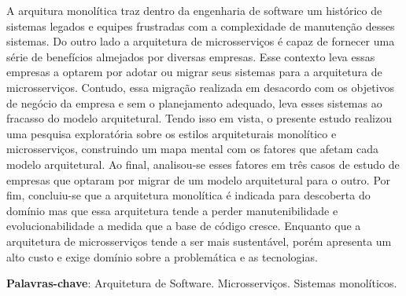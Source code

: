 \begin{resumo}
    A arquitura monolítica traz dentro da engenharia de software um histórico de sistemas legados e
    equipes frustradas com a complexidade de manutenção desses sistemas. Do outro lado a arquitetura
    de microsserviços é capaz de fornecer uma série de benefícios almejados por diversas empresas.
    Esse contexto leva essas empresas a optarem por adotar ou migrar seus sistemas para a
    arquitetura de microsserviços. Contudo, essa migração realizada em desacordo com os objetivos de
    negócio da empresa e sem o planejamento adequado, leva esses sistemas ao fracasso do modelo
    arquitetural. Tendo isso em vista, o presente estudo realizou uma pesquisa exploratória sobre os
    estilos arquiteturais monolítico e microsserviços, construindo um mapa mental com os fatores que
    afetam cada modelo arquitetural. Ao final, analisou-se esses fatores em três casos de estudo de
    empresas que optaram por migrar de um modelo arquitetural para o outro. Por fim, concluiu-se que
    a arquitetura monolítica é indicada para descoberta do domínio mas que essa arquitetura tende a
    perder manutenibilidade e evolucionabilidade a medida que a base de código cresce. Enquanto que
    a arquitetura de microsserviços tende a ser mais sustentável, porém apresenta um alto custo e
    exige domínio sobre a problemática e as tecnologias.
 \vspace{\onelineskip}
    
 \noindent
  \textbf{Palavras-chave}: Arquitetura de Software. Microsserviços. Sistemas monolíticos.
\end{resumo}
